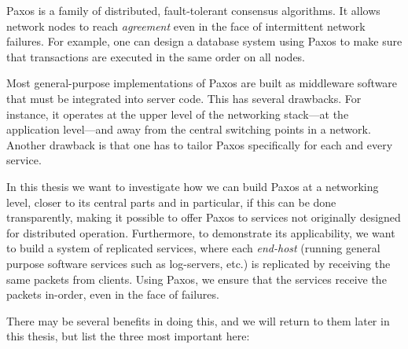 Paxos is a
family of distributed, fault-tolerant consensus algorithms.  It allows
network nodes to reach \textit{agreement} even in the face of intermittent
network failures.  For example, one can design a database system using Paxos
to make sure that transactions are executed in the same order on all nodes.

Most general-purpose implementations of Paxos are built as middleware
software that must be integrated into server code.  This has several
drawbacks.  For instance, it operates at the upper level of the networking
stack---at the application level---and away from the central switching
points in a network.  Another drawback is that one has to tailor Paxos
specifically for each and every service.

In this thesis we want to investigate how we can build Paxos at a networking
level, closer to its central parts and in particular, if this can be done
transparently, making it possible to offer Paxos to services not originally
designed for distributed operation.
%
Furthermore, to demonstrate its applicability, we want to build a system of
replicated services, where each \textit{end-host} (running general purpose
software services such as log-servers, etc.) is replicated by receiving the
same packets from clients.
%
Using Paxos, we ensure that the services receive the packets in-order, even
in the face of failures.

There may be several benefits in doing this, and we will return to them
later in this thesis, but list the three most important here:

